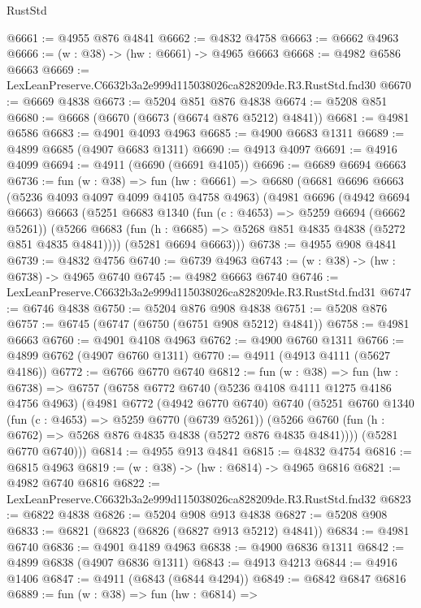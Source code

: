 \begin{lexlean}{RustStd}
\begin{coremodule}
@6661 := @4955 @876 @4841
@6662 := @4832 @4758
@6663 := @6662 @4963
@6666 := (w : @38) -> (hw : @6661) -> @4965 @6663
@6668 := @4982 @6586 @6663
@6669 := LexLeanPreserve.C6632b3a2e999d115038026ca828209de.R3.RustStd.fnd30
@6670 := @6669 @4838
@6673 := @5204 @851 @876 @4838
@6674 := @5208 @851
@6680 := @6668 (@6670 (@6673 (@6674 @876 @5212) @4841))
@6681 := @4981 @6586
@6683 := @4901 @4093 @4963
@6685 := @4900 @6683 @1311
@6689 := @4899 @6685 (@4907 @6683 @1311)
@6690 := @4913 @4097
@6691 := @4916 @4099
@6694 := @4911 (@6690 (@6691 @4105))
@6696 := @6689 @6694 @6663
@6736 := fun (w : @38) =>
  fun (hw : @6661) =>
  @6680
    (@6681
      @6696
      @6663
      (@5236 @4093 @4097 @4099 @4105 @4758 @4963)
      (@4981
        @6696
        (@4942 @6694 @6663)
        @6663
        (@5251
          @6683
          @1340
          (fun (c : @4653) => @5259 @6694 (@6662 @5261))
          (@5266 @6683 (fun (h : @6685) => @5268 @851 @4835 @4838 (@5272 @851 @4835 @4841))))
        (@5281 @6694 @6663)))
@6738 := @4955 @908 @4841
@6739 := @4832 @4756
@6740 := @6739 @4963
@6743 := (w : @38) -> (hw : @6738) -> @4965 @6740
@6745 := @4982 @6663 @6740
@6746 := LexLeanPreserve.C6632b3a2e999d115038026ca828209de.R3.RustStd.fnd31
@6747 := @6746 @4838
@6750 := @5204 @876 @908 @4838
@6751 := @5208 @876
@6757 := @6745 (@6747 (@6750 (@6751 @908 @5212) @4841))
@6758 := @4981 @6663
@6760 := @4901 @4108 @4963
@6762 := @4900 @6760 @1311
@6766 := @4899 @6762 (@4907 @6760 @1311)
@6770 := @4911 (@4913 @4111 (@5627 @4186))
@6772 := @6766 @6770 @6740
@6812 := fun (w : @38) =>
  fun (hw : @6738) =>
  @6757
    (@6758
      @6772
      @6740
      (@5236 @4108 @4111 @1275 @4186 @4756 @4963)
      (@4981
        @6772
        (@4942 @6770 @6740)
        @6740
        (@5251
          @6760
          @1340
          (fun (c : @4653) => @5259 @6770 (@6739 @5261))
          (@5266 @6760 (fun (h : @6762) => @5268 @876 @4835 @4838 (@5272 @876 @4835 @4841))))
        (@5281 @6770 @6740)))
@6814 := @4955 @913 @4841
@6815 := @4832 @4754
@6816 := @6815 @4963
@6819 := (w : @38) -> (hw : @6814) -> @4965 @6816
@6821 := @4982 @6740 @6816
@6822 := LexLeanPreserve.C6632b3a2e999d115038026ca828209de.R3.RustStd.fnd32
@6823 := @6822 @4838
@6826 := @5204 @908 @913 @4838
@6827 := @5208 @908
@6833 := @6821 (@6823 (@6826 (@6827 @913 @5212) @4841))
@6834 := @4981 @6740
@6836 := @4901 @4189 @4963
@6838 := @4900 @6836 @1311
@6842 := @4899 @6838 (@4907 @6836 @1311)
@6843 := @4913 @4213
@6844 := @4916 @1406
@6847 := @4911 (@6843 (@6844 @4294))
@6849 := @6842 @6847 @6816
@6889 := fun (w : @38) =>
  fun (hw : @6814) =>

\end{coremodule}
\end{lexlean}
